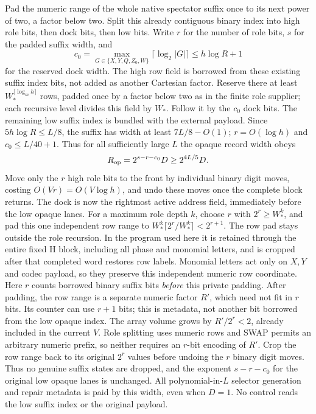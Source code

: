 Pad the numeric range of the whole native spectator suffix once to its
next power of two, a factor below two.  Split this already contiguous
binary index into high role bits, then dock bits, then low bits.  Write
$r$ for the number of role bits, $s$ for the padded suffix width, and
\[
 c_0=\max_{G\in\{X,Y,Q,Z_0,W\}}\lceil\log_2|G|\rceil
       \le h\log R+1
\]
for the reserved dock width. The high row field is borrowed from these
existing suffix index bits, not added as another Cartesian factor.
Reserve there at least
$W_*^{\lceil\log_m h\rceil}$ rows, padded once by a factor below two as
in the finite role supplier; each recursive level divides this field by
$W_*$.  Follow it by the $c_0$ dock bits.  The remaining low suffix index is bundled with the
external payload.  Since $5h\log R\le L/8$, the suffix has width at
least $7L/8-O(1)$; $r=O(\log h)$ and $c_0\le L/40+1$.  Thus for all
sufficiently large $L$ the opaque record width obeys
\[
 R_{\rm op}=2^{s-r-c_0}D\ge 2^{4L/5}D.
\]
Move only the $r$ high role bits to the front by individual binary
digit moves, costing $O(Vr)=O(V\log h)$, and undo these moves once
the complete block returns. The dock is now the rightmost active
address field, immediately before the low opaque lanes. For a maximum
role depth $k$, choose $r$ with $2^r\ge W_*^k$, and pad this one
independent row range to $W_*^k\lceil2^r/W_*^k\rceil<2^{r+1}$.
The row pad stays outside the role recursion. In the program used here
it is retained through the entire fixed H block, including all phase
and monomial letters, and is cropped after that completed word restores
row labels. Monomial letters act only on $X,Y$ and codec payload, so
they preserve this independent numeric row coordinate.
Here $r$ counts borrowed binary suffix bits \emph{before} this private
padding. After padding, the row range is a separate numeric factor
$R'$, which need not fit in $r$ bits. Its counter can use $r+1$ bits;
this is metadata, not another bit borrowed from the low opaque index.
The array volume grows by $R'/2^r<2$, already included in the current
$V$. Role splitting uses numeric rows and SWAP permits an arbitrary
numeric prefix, so neither requires an $r$-bit encoding of $R'$.
Crop the row range back to its original $2^r$ values before undoing
the $r$ binary digit moves. Thus no genuine suffix states are dropped,
and the exponent $s-r-c_0$ for the original low opaque lanes is unchanged.
All polynomial-in-$L$ selector generation and repair metadata is paid by
this width, even when $D=1$.  No control reads the low suffix index or
the original payload.

